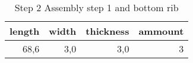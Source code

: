 \begin{table}[h!]
\centering
\caption{Step 2 Assembly step 1 and bottom rib}
\begin{tabular}{rrrr}
\toprule
 length &  width &  thickness &  ammount \\
\midrule
   68,6 &    3,0 &        3,0 &        3 \\
\bottomrule
\end{tabular}
\end{table}
